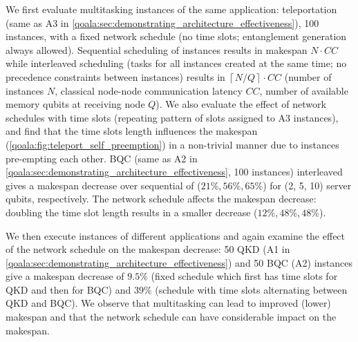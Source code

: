 We first evaluate multitasking instances of the same application: teleportation (same as A3 in \cref{qoala:sec:demonstrating_architecture_effectiveness}), 100 instances, with a fixed network schedule (no time slots; entanglement generation always allowed).
Sequential scheduling of instances results in makespan $N \cdot CC$
while interleaved scheduling (tasks for all instances created at the same time; no precedence constraints between instances) results in $\left\lceil N / Q \right\rceil \cdot CC$
(number of instances $N$, classical node-node communication latency $CC$, number of available memory qubits at receiving node $Q$).
We also evaluate the effect of network schedules with time slots (repeating pattern of slots assigned to A3 instances), and find that the time slots length influences the makespan (\cref{qoala:fig:teleport_self_preemption}) in a non-trivial manner due to instances pre-empting each other.
BQC (same as A2 in \cref{qoala:sec:demonstrating_architecture_effectiveness}, 100 instances) interleaved gives a makespan decrease over sequential of ($21\%, 56\%, 65\%$) for (2, 5, 10) server qubits, respectively.
The network schedule affects the makespan decrease: doubling the time slot length results in a smaller decrease ($12\%, 48\%, 48\%$). 

We then execute instances of different applications and again examine the effect of the network schedule on the makespan decrease: 50 QKD (A1 in \cref{qoala:sec:demonstrating_architecture_effectiveness}) and 50 BQC (A2) instances give a makespan decrease of $9.5\%$ (fixed schedule which first has time slots for QKD and then for BQC) and $39\%$ (schedule with time slots alternating between QKD and BQC).
We observe that multitasking can lead to improved (lower) makespan and that the network schedule can have considerable impact on the makespan.

